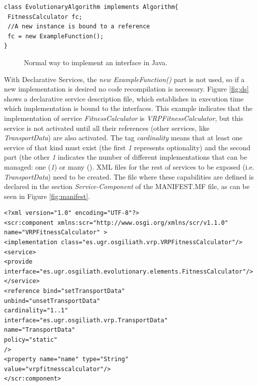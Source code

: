 \newsavebox{\mintedboxOSGIinst}
\begin{lrbox}{\mintedboxOSGIinst}
\begin{minipage}{10cm}
\begin{verbatim}
class EvolutionaryAlgorithm implements Algorithm{
 FitnessCalculator fc;
 //A new instance is bound to a reference
 fc = new ExampleFunction();
}
\end{verbatim}
\end{minipage}
\end{lrbox}

\begin{figure}
\usebox{\mintedboxOSGIinst}
\caption{Normal way to implement an interface in Java.} 
\label{fig:normalImp} 
\end{figure}


With Declarative Services, the {\em new ExampleFunction()} part is not used, so if a new implementation is desired no code recompilation is necessary.  Figure \ref{fig:ds} shows a declarative service description file, which establishes in execution time which implementation is bound to the interfaces. This example indicates that the implementation of service {\em FitnessCalculator} is {\em VRPFitnessCalculator}, but this service is not activated until all their references (other services, like {\em TransportData}) are also activated. The tag {\em cardinality} means that at least one service of that kind must exist (the first {\em 1} represents optionality) and  the second part (the other {\em 1} indicates the number of different implementations that can be managed: one ({\em 1}) or many ({\em *}).  XML files for the rest of services to be exposed (i.e. {\em TransportData}) need to be created. The file where these capabilities are defined is declared in the section {\em Service-Component} of the MANIFEST.MF file, as can be seen in Figure \ref{fig:manifest}.



\newsavebox{\mintedboxOSGIDS}
\begin{lrbox}{\mintedboxOSGIDS}
\begin{minipage}{10cm}
\begin{verbatim}
<?xml version="1.0" encoding="UTF-8"?>
<scr:component xmlns:scr="http://www.osgi.org/xmlns/scr/v1.1.0"
name="VRPFitnessCalculator" >
<implementation class="es.ugr.osgiliath.vrp.VRPFitnessCalculator"/>
<service>
<provide 
interface="es.ugr.osgiliath.evolutionary.elements.FitnessCalculator"/>
</service>
<reference bind="setTransportData"
unbind="unsetTransportData"
cardinality="1..1"
interface="es.ugr.osgiliath.vrp.TransportData"
name="TransportData"
policy="static"
/>
<property name="name" type="String"
value="vrpfitnesscalculator"/>
</scr:component>
\end{verbatim}
\end{minipage}
\end{lrbox}


